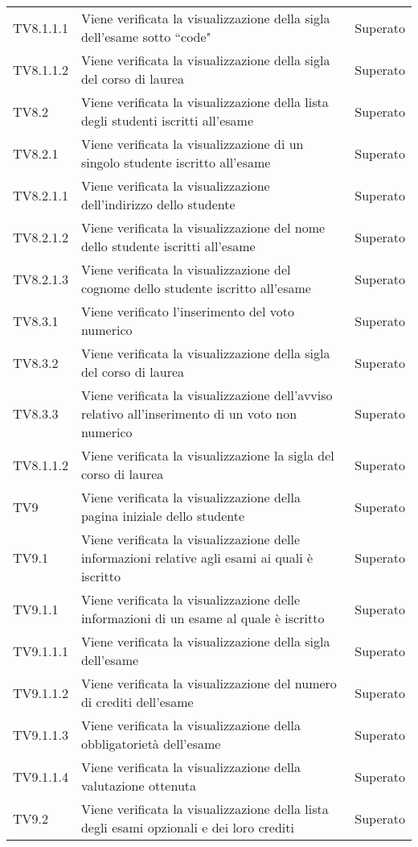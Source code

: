\documentclass[PianoDiQualifica.tex]{subfiles}
\begin{document}
\begin{longtable}[H]{P{2cm}P{8.5cm}P{3cm}}
	TV8.1.1.1 & Viene verificata la visualizzazione della sigla dell'esame sotto ``code" & Superato \\
	TV8.1.1.2 & Viene verificata la visualizzazione della sigla del corso di laurea & Superato \\
	TV8.2 & Viene verificata la visualizzazione della lista degli studenti iscritti all'esame & Superato \\
	TV8.2.1 & Viene verificata la visualizzazione di un singolo studente iscritto all'esame & Superato \\
	TV8.2.1.1 & Viene verificata la visualizzazione dell'indirizzo dello studente & Superato \\
	TV8.2.1.2 & Viene verificata la visualizzazione del nome dello studente iscritti all'esame & Superato \\
	TV8.2.1.3 & Viene verificata la visualizzazione del cognome dello studente iscritto all'esame & Superato \\
	TV8.3.1 & Viene verificato l'inserimento del voto numerico & Superato \\
	TV8.3.2 & Viene verificata la visualizzazione della sigla del corso di laurea & Superato \\
	TV8.3.3 & Viene verificata la visualizzazione dell'avviso relativo all'inserimento di un voto non numerico & Superato \\
	TV8.1.1.2 & Viene verificata la visualizzazione la sigla del corso di laurea & Superato \\
	TV9 & Viene verificata la visualizzazione della pagina iniziale dello studente & Superato \\
	TV9.1 & Viene verificata la visualizzazione delle informazioni relative agli esami ai quali è iscritto & Superato \\
	TV9.1.1 & Viene verificata la visualizzazione delle informazioni di un esame al quale è iscritto & Superato \\
	TV9.1.1.1 & Viene verificata la visualizzazione della sigla dell'esame & Superato \\
	TV9.1.1.2 & Viene verificata la visualizzazione del numero di crediti dell'esame & Superato \\
	TV9.1.1.3 & Viene verificata la visualizzazione della obbligatorietà dell'esame & Superato \\
	TV9.1.1.4 & Viene verificata la visualizzazione della valutazione ottenuta & Superato \\
	TV9.2 & Viene verificata la visualizzazione della lista degli esami opzionali e dei loro crediti & Superato \\

\end{longtable}
\end{document}
